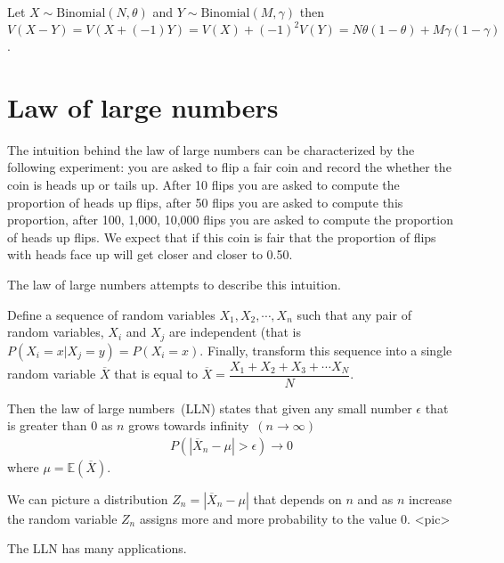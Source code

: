 \ex Let $X \sim \text{Binomial}(N,\theta)$ and $Y \sim \text{Binomial}(M,\gamma)$ then $V(X-Y) = V(X + (-1) Y) = V(X) + (-1)^{2} V(Y) = N \theta (1-\theta) + M \gamma (1-\gamma)$.

\section{Law of large numbers}\label{intro}

The intuition behind the law of large numbers can be characterized by the following experiment: you are asked to flip a fair coin and record the whether the coin is heads up or tails up. After 10 flips you are asked to compute the proportion of heads up flips, after 50 flips you are asked to compute this proportion, after 100, 1,000, 10,000 flips you are asked to compute the proportion of heads up flips. We expect that if this coin is fair that the proportion of flips with heads face up will get closer and closer to 0.50. 

The law of large numbers attempts to describe this intuition.

Define a sequence of random variables $X_{1}, X_{2}, \cdots, X_{n}$ such that any pair of random variables, $X_{i}$ and $X_{j}$ are independent (that is $P(X_{i} = x | X_{j} = y) =P(X_{i} = x)$. Finally, transform this sequence into a single random variable $\overline{X}$ that is equal to $\overline{X} = \dfrac{X_{1} + X_{2} + X_{3} + \cdots X_{N}}{N}$. 

Then the law of large numbers~(LLN) states that given any small number $\epsilon$ that is greater than 0 as $n$ grows towards infinity~$(n \to \infty)$
\begin{align}
    P( | \overline{X}_{n} - \mu | > \epsilon ) \to 0
\end{align}
where $\mu = \mathbb{E}(\overline{X})$.

We can picture a distribution $Z_{n} = | \overline{X}_{n} - \mu |$ that depends on $n$ and as $n$ increase the random variable $Z_{n}$ assigns more and more probability to the value 0.
<pic>

The LLN has many applications. 

